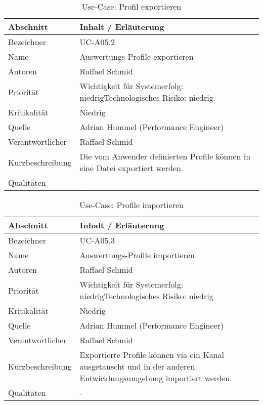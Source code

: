 \begin{longtable}{|p{4cm}|p{10.5cm}|}
\caption{Use-Case: Profil exportieren }\\\hline
   \textbf{Abschnitt} & \textbf{Inhalt / Erläuterung} \\\hline
   Bezeichner & UC-A05.2\\\hline
   Name & Auswertungs-Profile exportieren\\\hline
   Autoren & Raffael Schmid\\\hline
   Priorität & Wichtigkeit für Systemerfolg: niedrig\newline Technologisches Risiko: niedrig\\\hline
   Kritikalität & Niedrig\\\hline
   Quelle & Adrian Hummel (Performance Engineer)\\\hline
   Verantwortlicher & Raffael Schmid\\\hline
   Kurzbeschreibung & Die vom Anwender definierten Profile können in eine Datei exportiert werden.\\\hline
   Qualitäten & -\\\hline
\end{longtable}

\begin{longtable}{|p{4cm}|p{10.5cm}|}
\caption{Use-Case: Profile importieren }\\\hline
   \textbf{Abschnitt} & \textbf{Inhalt / Erläuterung} \\\hline
   Bezeichner & UC-A05.3\\\hline
   Name & Auswertungs-Profile importieren\\\hline
   Autoren & Raffael Schmid\\\hline
   Priorität & Wichtigkeit für Systemerfolg: niedrig\newline Technologisches Risiko: niedrig\\\hline
   Kritikalität & Niedrig\\\hline
   Quelle & Adrian Hummel (Performance Engineer)\\\hline
   Verantwortlicher & Raffael Schmid\\\hline
   Kurzbeschreibung & Exportierte Profile können via ein Kanal ausgetauscht und in der anderen Entwicklungsumgebung importiert werden.  \\\hline
   Qualitäten & -\\\hline
\end{longtable}

